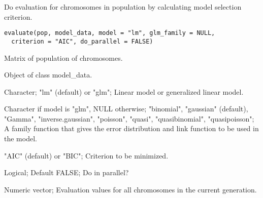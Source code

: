 %
\begin{Description}\relax
Do evaluation for chromosomes in population by calculating model selection criterion.
\end{Description}
%
\begin{Usage}
\begin{verbatim}
evaluate(pop, model_data, model = "lm", glm_family = NULL,
  criterion = "AIC", do_parallel = FALSE)
\end{verbatim}
\end{Usage}
%
\begin{Arguments}
\begin{ldescription}
\item[\code{pop}] Matrix of population of chromosomes.

\item[\code{model\_data}] Object of class model\_data.

\item[\code{model}] Character; "lm" (default) or "glm"; Linear model or
generalized linear model.

\item[\code{glm\_family}] Character if model is "glm", NULL otherwise;
"binomial", "gaussian" (default), "Gamma", "inverse.gaussian", "poisson", "quasi",
"quasibinomial", "quasipoisson"; A family function that gives the error
distribution and link function to be used in the model.

\item[\code{criterion}] "AIC" (default) or "BIC"; Criterion to be minimized.

\item[\code{do\_parallel}] Logical; Default FALSE; Do in parallel?
\end{ldescription}
\end{Arguments}
%
\begin{Value}
Numeric vector; Evaluation values for all chromosomes
in the current generation.
\end{Value}

